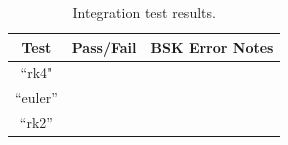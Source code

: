 \begin{table}[h]
	\caption{Integration test results.}
	\label{tbl:intResults}
	\centering \fontsize{10}{10}\selectfont
	\begin{tabular}{c | c | p{4in} } %
		\hline\hline
		\textbf{Test} 			& \textbf{Pass/Fail} 	 & \textbf{BSK Error Notes} 									        
		\\ \hline
		``rk4"		  	& 
		      	  &
		
		\\ \hline
		``euler''	   	           	&
		           		&      
		  
		\\ \hline
		``rk2''      	&
		
		&  
		
		\\ 
		\hline\hline
	\end{tabular}
\end{table}

